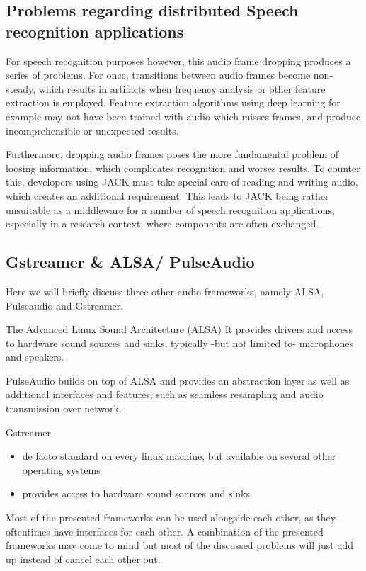 \subsection{Problems regarding distributed Speech recognition applications}
For speech recognition purposes however, this audio frame dropping produces a series of problems. 
For once, transitions between audio frames become non-steady, which results in artifacts when frequency analysis or other feature extraction is employed.
Feature extraction algorithms using deep learning for example may not have been trained with audio which misses frames, and produce incomprehensible or unexpected results.

Furthermore, dropping audio frames poses the more fundamental problem of loosing information, which complicates recognition and worses results. 
To counter this, developers using JACK must take special care of reading and writing audio, which creates an additional requirement.
This leads to JACK being rather unsuitable as a middleware for a number of speech recognition applications, especially in a research context, where components are often exchanged.

\subsection{Gstreamer \& ALSA/ PulseAudio}

Here we will briefly discuss three other audio frameworks, namely ALSA, Pulseaudio and Gstreamer.

The Advanced Linux Sound Architecture (ALSA) 
It provides drivers and access to hardware sound sources and sinks, typically -but not limited to- microphones and speakers.

PulseAudio builds on top of ALSA and provides an abstraction layer as well as additional interfaces and features, such as seamless resampling and audio transmission over network.

Gstreamer \cite{Gstreamer}

\begin{itemize}
	\item de facto standard on every linux machine, but available on several other operating systems
	\item provides access to hardware sound sources and sinks
\end{itemize}

Most of the presented frameworks can be used alongside each other, as they oftentimes have interfaces for each other. 
A combination of the presented frameworks may come to mind but most of the discussed problems will just add up instead of cancel each other out.
